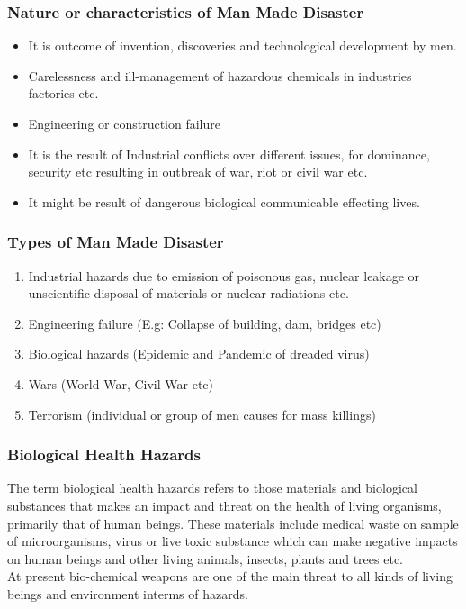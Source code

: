\documentclass[12pt,a4paper]{article}
\begin{document}
\subsubsection*{Nature or characteristics of Man Made Disaster}
\begin{itemize}
	\item It is outcome of invention, discoveries and technological  development by men.
	\item Carelessness and ill-management of hazardous chemicals in industries factories etc.
	\item Engineering or construction failure
	\item It is the result of Industrial conflicts over different issues, for dominance, security etc resulting in outbreak of war, riot or civil war etc.
	\item It might be result of dangerous biological communicable effecting lives.
\end{itemize}

\subsubsection*{Types of Man Made Disaster}
\begin{enumerate}
	\item Industrial hazards due to emission of poisonous gas, nuclear leakage or unscientific disposal of materials or nuclear radiations etc.
	\item Engineering failure (E.g: Collapse of building, dam, bridges etc)
	\item Biological hazards (Epidemic and Pandemic of dreaded virus)
	\item Wars (World War, Civil War etc)
	\item Terrorism (individual or group of men causes for mass killings)
\end{enumerate}



\subsubsection*{Biological Health Hazards}
The term biological health hazards refers to those materials and biological substances that makes an impact and threat on the health of living organisms, primarily that of human beings. 
These materials include medical waste on sample of microorganisms, virus or live toxic substance which can make negative impacts on human beings and other living animals, insects, plants and trees etc. \\
At present bio-chemical weapons are one of the main threat to all kinds of living beings and environment interms of hazards.
\end{document}

